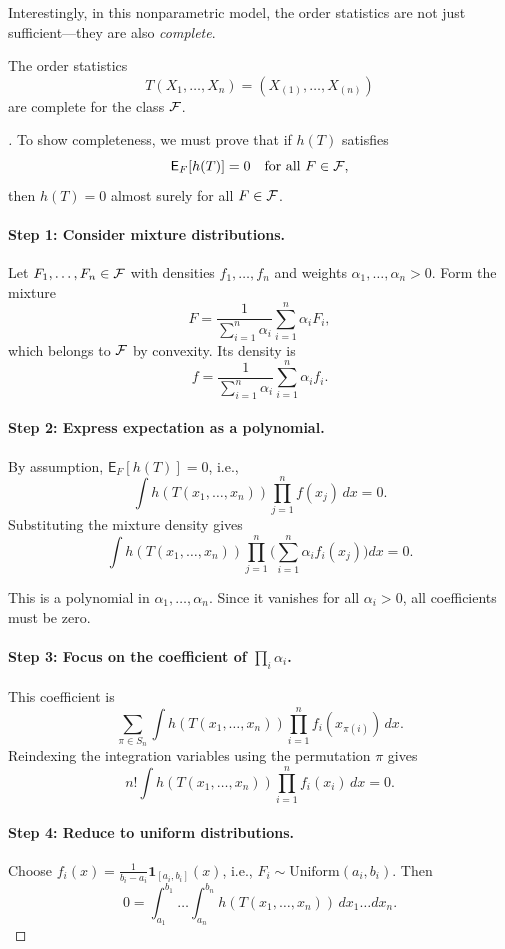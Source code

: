 Interestingly, in this nonparametric model, the order statistics are not just sufficient—they are also \emph{complete}.

\begin{theo}[]
\label{theo:nue}
The order statistics 
\[
T(X_{1}, \dots, X_{n}) = (X_{(1)}, \dots, X_{(n)})
\]
are complete for the class \(\mathcal{F}\).
\end{theo}

\begin{proof}[]
To show completeness, we must prove that if \(h(T)\) satisfies 
\[
\mathsf{E}_F[h(T)] = 0 \quad \text{for all } F \in \mathcal{F},
\] 
then \(h(T) = 0\) almost surely for all \(F \in \mathcal{F}\).

\paragraph{Step 1: Consider mixture distributions.}  
Let \(F_1, \dots, F_n \in \mathcal{F}\) with densities \(f_1, \dots, f_n\) and weights \(\alpha_1, \dots, \alpha_n > 0\). Form the mixture
\[
F = \frac{1}{\sum_{i=1}^{n} \alpha_i} \sum_{i=1}^{n} \alpha_i F_i,
\]
which belongs to \(\mathcal{F}\) by convexity. Its density is 
\[
f = \frac{1}{\sum_{i=1}^{n} \alpha_i} \sum_{i=1}^{n} \alpha_i f_i.
\]

\paragraph{Step 2: Express expectation as a polynomial.}  
By assumption, \(\mathsf{E}_F[h(T)] = 0\), i.e.,
\[
\int h(T(x_1, \dots, x_n)) \prod_{j=1}^{n} f(x_j) \, dx = 0.
\]  
Substituting the mixture density gives
\[
\int h(T(x_1, \dots, x_n)) \prod_{j=1}^{n} \Big( \sum_{i=1}^{n} \alpha_i f_i(x_j) \Big) dx = 0.
\]

This is a polynomial in \(\alpha_1, \dots, \alpha_n\). Since it vanishes for all \(\alpha_i>0\), all coefficients must be zero.

\paragraph{Step 3: Focus on the coefficient of \(\prod_i \alpha_i\).}  
This coefficient is
\[
\sum_{\pi \in S_n} \int h(T(x_1, \dots, x_n)) \prod_{i=1}^{n} f_i(x_{\pi(i)}) \, dx.
\]
Reindexing the integration variables using the permutation \(\pi\) gives
\[
n! \int h(T(x_1, \dots, x_n)) \prod_{i=1}^{n} f_i(x_i) \, dx = 0.
\]

\paragraph{Step 4: Reduce to uniform distributions.}  
Choose \(f_i(x) = \frac{1}{b_i - a_i} \mathbf{1}_{[a_i, b_i]}(x)\), i.e., \(F_i \sim \text{Uniform}(a_i, b_i)\). Then
\[
0 = \int_{a_1}^{b_1} \dots \int_{a_n}^{b_n} h(T(x_1, \dots, x_n)) \, dx_1 \dots dx_n.
\]


\end{proof}
